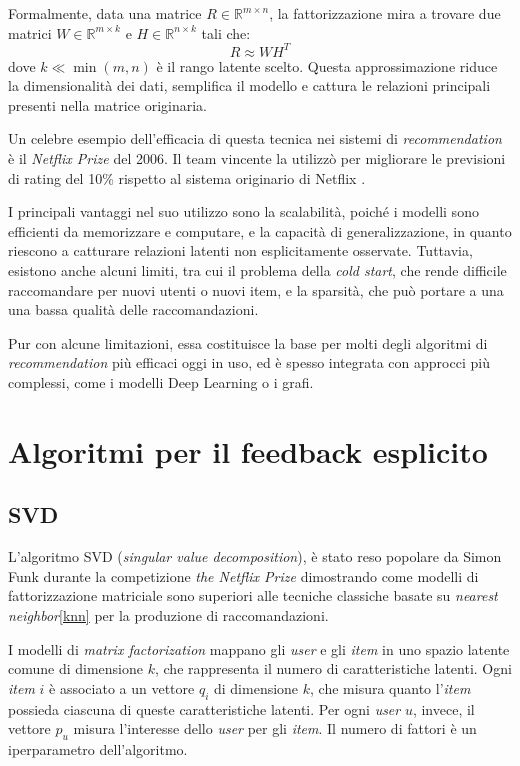 Formalmente, data una matrice $R \in \mathbb{R}^{m \times n}$, la fattorizzazione mira a trovare due matrici $W \in \mathbb{R}^{m \times k}$ e $H \in \mathbb{R}^{n \times k}$ tali che:
\[
R \approx WH^T
\]
dove $k \ll \min(m,n)$ è il rango latente scelto. Questa approssimazione riduce la dimensionalità dei dati, semplifica il modello e cattura le relazioni principali presenti nella matrice originaria.

Un celebre esempio dell'efficacia di questa tecnica nei sistemi di \textit{recommendation} è il \textit{Netflix Prize} del 2006. Il team vincente la utilizzò per migliorare le previsioni di rating del 10\% rispetto al sistema originario di Netflix \cite{TheNP}.

I principali vantaggi nel suo utilizzo sono la scalabilità, poiché i modelli sono efficienti da memorizzare e computare, e la capacità di generalizzazione, in quanto riescono a catturare relazioni latenti non esplicitamente osservate. Tuttavia, esistono anche alcuni limiti, tra cui il problema della \textit{cold start}, che rende difficile raccomandare per nuovi utenti o nuovi item, e la sparsità, che può portare a una una bassa qualità delle raccomandazioni\cite{SVD_analysis}.

Pur con alcune limitazioni, essa costituisce la base per molti degli algoritmi di \textit{recommendation} più efficaci oggi in uso, ed è spesso integrata con approcci più complessi, come i modelli Deep Learning o i grafi.


\section{Algoritmi per il feedback esplicito}\label{algoritmi-per-feedback-esplicito}

\subsection{SVD}\label{svd}

L'algoritmo SVD (\textit{singular value decomposition}), è stato reso popolare da Simon Funk durante la competizione \textit{the Netflix Prize} dimostrando come modelli di fattorizzazione matriciale sono superiori alle tecniche classiche basate su \textit{nearest neighbor}\ref{knn} per
la produzione di raccomandazioni.

I modelli di \textit{matrix factorization} mappano gli \textit{user} e gli \textit{item} in uno spazio latente comune di dimensione $k$, che rappresenta il numero di caratteristiche latenti. Ogni \textit{item} $i$ è associato a un vettore $q_i$ di dimensione $k$, che misura quanto l'\textit{item} possieda ciascuna di queste caratteristiche latenti. Per ogni \textit{user} $u$, invece, il vettore $p_u$ misura l'interesse dello \textit{user} per gli \textit{item}. Il numero di fattori è un iperparametro dell'algoritmo.

